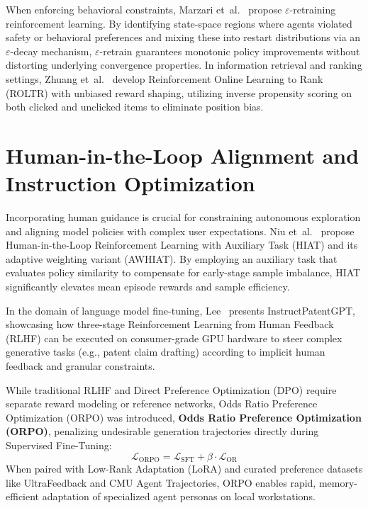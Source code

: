 \documentclass[12pt,a4paper]{report}
\begin{document}
When enforcing behavioral constraints, Marzari et~al.~\cite{ref_marzari2026_epsretrain} propose $\varepsilon$-retraining reinforcement learning. By identifying state-space regions where agents violated safety or behavioral preferences and mixing these into restart distributions via an $\varepsilon$-decay mechanism, $\varepsilon$-retrain guarantees monotonic policy improvements without distorting underlying convergence properties. In information retrieval and ranking settings, Zhuang et~al.~\cite{ref_zhuang2022_roltr} develop Reinforcement Online Learning to Rank (ROLTR) with unbiased reward shaping, utilizing inverse propensity scoring on both clicked and unclicked items to eliminate position bias.

\section{Human-in-the-Loop Alignment and Instruction Optimization}
Incorporating human guidance is crucial for constraining autonomous exploration and aligning model policies with complex user expectations. Niu et~al.~\cite{ref_niu2025_hiat} propose Human-in-the-Loop Reinforcement Learning with Auxiliary Task (HIAT) and its adaptive weighting variant (AWHIAT). By employing an auxiliary task that evaluates policy similarity to compensate for early-stage sample imbalance, HIAT significantly elevates mean episode rewards and sample efficiency.

In the domain of language model fine-tuning, Lee~\cite{ref_lee2025_instructpatentgpt} presents InstructPatentGPT, showcasing how three-stage Reinforcement Learning from Human Feedback (RLHF) can be executed on consumer-grade GPU hardware to steer complex generative tasks (e.g., patent claim drafting) according to implicit human feedback and granular constraints.

While traditional RLHF and Direct Preference Optimization (DPO) require separate reward modeling or reference networks, Odds Ratio Preference Optimization (ORPO) was introduced, \textbf{Odds Ratio Preference Optimization (ORPO)}, penalizing undesirable generation trajectories directly during Supervised Fine-Tuning:
\begin{equation}
    \mathcal{L}_{\mathrm{ORPO}} = \mathcal{L}_{\mathrm{SFT}} + \beta \cdot \mathcal{L}_{\mathrm{OR}}
\end{equation}
When paired with Low-Rank Adaptation (LoRA) and curated preference datasets like UltraFeedback and CMU Agent Trajectories, ORPO enables rapid, memory-efficient adaptation of specialized agent personas on local workstations.
\end{document}
